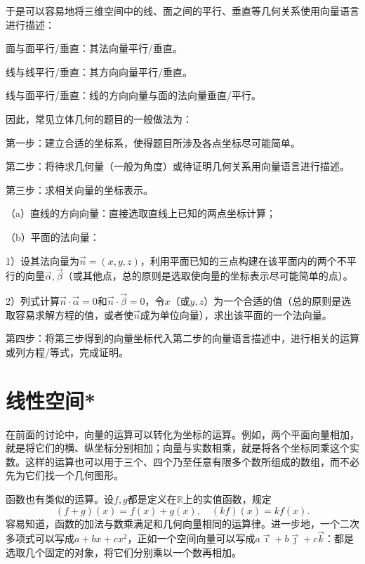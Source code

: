 于是可以容易地将三维空间中的线、面之间的平行、垂直等几何关系使用向量语言进行描述：

面与面平行/垂直：其法向量平行/垂直。

线与线平行/垂直：其方向向量平行/垂直。

线与面平行/垂直：线的方向向量与面的法向量垂直/平行。

因此，常见立体几何的题目的一般做法为：

第一步：建立合适的坐标系，使得题目所涉及各点坐标尽可能简单。

第二步：将待求几何量（一般为角度）或待证明几何关系用向量语言进行描述。

第三步：求相关向量的坐标表示。

（a）直线的方向向量：直接选取直线上已知的两点坐标计算；

（b）平面的法向量：

1）设其法向量为\(\vec{n} = \left( x , y , z \right)\)，利用平面已知的三点构建在该平面内的两个不平行的向量\(\vec{\alpha} , \vec{\beta}\)（或其他点，总的原则是选取使向量的坐标表示尽可能简单的点）。

2）列式计算\(\vec{n} \cdot \vec{\alpha} = 0\)和\(\vec{n} \cdot \vec{\beta} = 0\)，令\(x\)（或\(y , z\)）为一个合适的值（总的原则是选取容易求解方程的值，或者使\(\vec{n}\)成为单位向量），求出该平面的一个法向量。

第四步：将第三步得到的向量坐标代入第二步的向量语言描述中，进行相关的运算或列方程/等式，完成证明。

\section{线性空间*}
在前面的讨论中，向量的运算可以转化为坐标的运算。例如，两个平面向量相加，就是将它们的横、纵坐标分别相加；向量与实数相乘，就是将各个坐标同乘这个实数。这样的运算也可以用于三个、四个乃至任意有限多个数所组成的数组，而不必先为它们找一个几何图形。

函数也有类似的运算。设\(f , g\)都是定义在\(\mathbb{R}\)上的实值函数，规定
\begin{equation}
    \left( f + g \right) \left( x \right) = f \left( x \right) + g \left( x \right) , \quad \left( k f \right) \left( x \right) = k f \left( x \right) .
\end{equation}
容易知道，函数的加法与数乘满足和几何向量相同的运算律。进一步地，一个二次多项式可以写成\(a + b x + c x^{2}\)，正如一个空间向量可以写成\(a \vec{\imath} + b \vec{\jmath} + c \vec{k}\)：都是选取几个固定的对象，将它们分别乘以一个数再相加。

